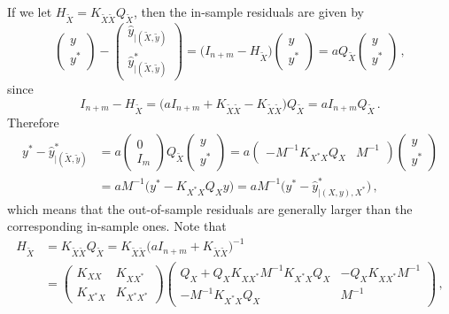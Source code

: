 \documentclass[a4paper,14pt]{article}
\begin{document}
If we let $H_{\tilde{X}} = K_{\tilde{X}\tilde{X}} Q_{\tilde{X}}$, then
the in-sample residuals are given by
$$ \begin{pmatrix} y\\ y^* \end{pmatrix} - \begin{pmatrix}
      \hat{y}_{|(\tilde{X}, \tilde{y})} \\
      \hat{y}^*_{|(\tilde{X}, \tilde{y})}
    \end{pmatrix}
  = \bigl( I_{n+m} - H_{\tilde{X}} \bigr)
    \begin{pmatrix} y\\ y^* \end{pmatrix}
  = a Q_{\tilde{X}}
    \begin{pmatrix} y\\ y^* \end{pmatrix}
  \,, $$
since
$$ I_{n+m} - H_{\tilde{X}}
  = \bigl(
      a I_{n+m} + K_{\tilde{X}\tilde{X}} - K_{\tilde{X}\tilde{X}}
    \bigr) Q_{\tilde{X}}
  = a I_{n+m} Q_{\tilde{X}}
  \,. $$
Therefore
\begin{align*}
  y^* - \hat{y}^*_{|(\tilde{X}, \tilde{y})}
    &= a \begin{pmatrix} 0\\ I_m \end{pmatrix} Q_{\tilde{X}}
        \begin{pmatrix} y\\ y^* \end{pmatrix}
    = a \begin{pmatrix} - M^{-1} K_{X^*X} Q_X & M^{-1} \end{pmatrix}
      \begin{pmatrix} y\\ y^* \end{pmatrix} \\
    &= a M^{-1} \bigl( y^* - K_{X^*X} Q_X y \bigr)
    = a M^{-1} \bigl( y^* - \hat{y}^*_{|(X, y), X^*} \bigr)
    \,,
\end{align*}
which means that the out-of-sample residuals are generally larger than the corresponding
in-sample ones. Note that 
\begin{align*}
  H_{\tilde{X}}
    &= K_{\tilde{X}\tilde{X}} Q_{\tilde{X}}
     = K_{\tilde{X}\tilde{X}} \bigl( a I_{n+m} + K_{\tilde{X}\tilde{X}} \bigr)^{-1}\\
    &= \begin{pmatrix}
      K_{XX} & K_{XX^*} \\
      K_{X^*X} & K_{X^*X^*}
    \end{pmatrix}
    \begin{pmatrix}
      Q_X + Q_X K_{XX^*} M^{-1} K_{X^*X} Q_X & - Q_X K_{XX^*} M^{-1} \\
      - M^{-1} K_{X^*X} Q_X & M^{-1}
    \end{pmatrix}
    \,,
\end{align*} 
\end{document}
